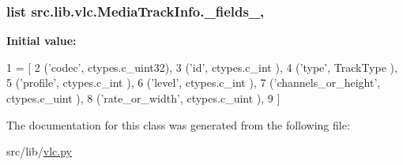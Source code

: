 \subsubsection[{\+\_\+fields\+\_\+}]{\setlength{\rightskip}{0pt plus 5cm}list src.\+lib.\+vlc.\+Media\+Track\+Info.\+\_\+fields\+\_\+\hspace{0.3cm}{\ttfamily [static]}, {\ttfamily [private]}}\label{classsrc_1_1lib_1_1vlc_1_1MediaTrackInfo_a444f39463dae0df3bc71919b71f4afcd}
{\bfseries Initial value\+:}
\begin{DoxyCode}
1 = [
2         (\textcolor{stringliteral}{'codec'},              ctypes.c\_uint32),
3         (\textcolor{stringliteral}{'id'},                 ctypes.c\_int   ),
4         (\textcolor{stringliteral}{'type'},               TrackType      ),
5         (\textcolor{stringliteral}{'profile'},            ctypes.c\_int   ),
6         (\textcolor{stringliteral}{'level'},              ctypes.c\_int   ),
7         (\textcolor{stringliteral}{'channels\_or\_height'}, ctypes.c\_uint  ),
8         (\textcolor{stringliteral}{'rate\_or\_width'},      ctypes.c\_uint  ),
9     ]
\end{DoxyCode}


The documentation for this class was generated from the following file\+:\begin{DoxyCompactItemize}
\item 
src/lib/\hyperlink{vlc_8py}{vlc.\+py}\end{DoxyCompactItemize}
